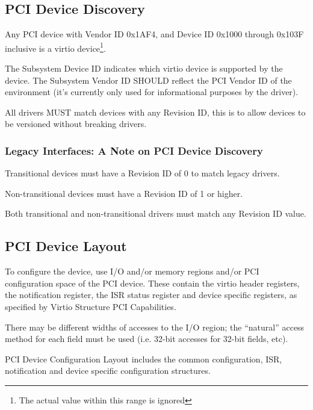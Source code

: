 \subsection{PCI Device Discovery}\label{sec:Virtio Transport Options / Virtio Over PCI Bus / PCI Device Discovery}

Any PCI device with Vendor ID 0x1AF4, and Device ID 0x1000 through
0x103F inclusive is a virtio device\footnote{The actual value within this range is ignored
}.

The Subsystem Device ID indicates which virtio device is
supported by the device. The Subsystem Vendor ID SHOULD reflect
the PCI Vendor ID of the environment (it's currently only used
for informational purposes by the driver).

All drivers MUST match devices with any Revision ID, this
is to allow devices to be versioned without breaking drivers.

\subsubsection{Legacy Interfaces: A Note on PCI Device Discovery}\label{sec:Virtio Transport Options / Virtio Over PCI Bus / PCI Device Discovery / Legacy Interfaces: A Note on PCI Device Discovery}
Transitional devices must have a Revision ID of 0 to match
legacy drivers.

Non-transitional devices must have a Revision ID of 1 or higher.

Both transitional and non-transitional drivers must match
any Revision ID value.

\subsection{PCI Device Layout}\label{sec:Virtio Transport Options / Virtio Over PCI Bus / PCI Device Layout}

To configure the device,
use I/O and/or memory regions and/or PCI configuration space of the PCI device.
These contain the virtio header registers, the notification register, the
ISR status register and device specific registers, as specified by Virtio
Structure PCI Capabilities.

There may be different widths of accesses to the I/O region; the
“natural” access method for each field must be
used (i.e. 32-bit accesses for 32-bit fields, etc).

PCI Device Configuration Layout includes the common configuration,
ISR, notification and device specific configuration
structures.

